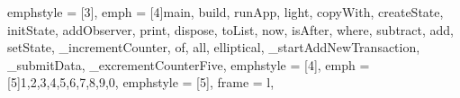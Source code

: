 {    emphstyle       =   [3]\color{VC_BlueGrey},
    emph            =   [4]{main, build, runApp, light, copyWith, createState, initState, addObserver, print, dispose, toList, now, isAfter, where,                                 subtract, add, setState, _incrementCounter, of, all, elliptical, _startAddNewTransaction, _submitData, _excrementCounterFive},
    emphstyle       =   [4]\color{VC_Dart_main},
    emph            =   [5]{1,2,3,4,5,6,7,8,9,0},
    emphstyle       =   [5]\color{UNIBW},
    frame           =   l,
}




